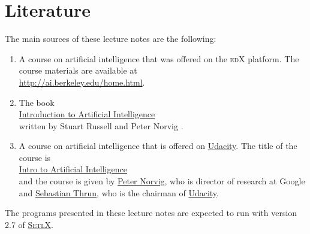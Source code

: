 \section{Literature}
The main sources of these lecture notes are the following:
\begin{enumerate}
\item A course on artificial intelligence that was offered on the \textsc{edX} platform.  The course
      materials are available at  
      \\[0.2cm]
      \hspace*{1.3cm}
      \href{http://ai.berkeley.edu/home.html}{http://ai.berkeley.edu/home.html}.
\item The book
      \\[0.2cm]
      \hspace*{1.3cm}
      \href{http://www.google.com/search?q=introduction+to+Artificial+Intelligence+RusseLl+Norvig+pdf}{Introduction to Artificial Intelligence}
      \\[0.2cm]
      written by Stuart Russell and Peter Norvig \cite{russell:2009}.
\item A course on artificial intelligence that is offered on \href{https://www.udacity.com}{Udacity}.  The title of the
      course is
      \\[0.2cm]
      \hspace*{1.3cm}
      \href{https://www.udacity.com/course/intro-to-artificial-intelligence--cs271}{Intro to Artificial Intelligence}
      \\[0.2cm]
      and the course is given by \href{https://en.wikipedia.org/wiki/Peter_Norvig}{Peter Norvig}, who is
      director of research at Google and \href{https://en.wikipedia.org/wiki/Sebastian_Thrun}{Sebastian Thrun},
      who is the chairman of \href{https://www.udacity.com}{Udacity}.
\end{enumerate}
The programs presented in these lecture notes are expected to run with version 2.7 of 
\href{https://randoom.org/Software/SetlX}{\textsc{SetlX}}.


